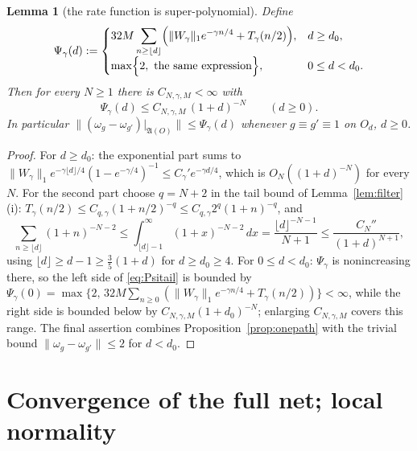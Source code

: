\documentclass[11pt,a4paper]{article}
\theoremstyle{plain}
\newtheorem{lemma}[theorem]{Lemma}
\theoremstyle{definition}
\theoremstyle{plain}
\theoremstyle{definition}
\newcommand{\A}{\mathfrak{A}}
\begin{document}
\begin{lemma}[the rate function is super-polynomial]\label{lem:rate}
Define
\begin{equation}
 \Psi_\gamma(d):=
 \begin{cases}
 \displaystyle
 32M\sum_{n\ge\lfloor d\rfloor}
 \Bigl(\|W_\gamma\|_1e^{-\gamma n/4}+T_\gamma(n/2)\Bigr), & d\ge d_0,\\[6pt]
 \max\Bigl\{2,\ \text{the same expression}\Bigr\}, & 0\le d<d_0 .
 \end{cases}
 \label{eq:Psidef}
\end{equation}
Then for every $N\ge1$ there is $C_{N,\gamma,M}<\infty$ with
\begin{equation}
 \Psi_\gamma(d)\le C_{N,\gamma,M}\,(1+d)^{-N}\qquad(d\ge0) .
 \label{eq:Psitail}
\end{equation}
In particular $\|(\omega_g-\omega_{g'})|_{\A(O)}\|\le\Psi_\gamma(d)$ whenever
$g\equiv g'\equiv1$ on $O_d$, $d\ge0$.
\end{lemma}

\begin{proof}
For $d\ge d_0$: the exponential part sums to
$\|W_\gamma\|_1e^{-\gamma\lfloor d\rfloor/4}(1-e^{-\gamma/4})^{-1}
\le C_\gamma'e^{-\gamma d/4}$, which is $O_N((1+d)^{-N})$ for every $N$. For the second
part choose $q=N+2$ in the tail bound of Lemma~\ref{lem:filter}(i):
$T_\gamma(n/2)\le C_{q,\gamma}(1+n/2)^{-q}\le C_{q,\gamma}2^{q}(1+n)^{-q}$, and
\[
 \sum_{n\ge\lfloor d\rfloor}(1+n)^{-N-2}
 \le\int_{\lfloor d\rfloor-1}^\infty(1+x)^{-N-2}\,dx
 =\frac{\lfloor d\rfloor^{-N-1}}{N+1}
 \le\frac{C_N''}{(1+d)^{N+1}} ,
\]
using $\lfloor d\rfloor\ge d-1\ge\tfrac35(1+d)$ for $d\ge d_0\ge4$. For $0\le d<d_0$:
$\Psi_\gamma$ is nonincreasing there, so the left side of \eqref{eq:Psitail} is bounded
by $\Psi_\gamma(0)=\max\{2,\,32M\sum_{n\ge0}(\|W_\gamma\|_1e^{-\gamma n/4}
+T_\gamma(n/2))\}<\infty$, while the right side is bounded below by
$C_{N,\gamma,M}(1+d_0)^{-N}$; enlarging $C_{N,\gamma,M}$ covers this range. The final assertion combines Proposition~\ref{prop:onepath} with the
trivial bound $\|\omega_g-\omega_{g'}\|\le2$ for $d<d_0$.
\end{proof}

\section{Convergence of the full net; local normality}\label{sec:limit}
\end{document}
